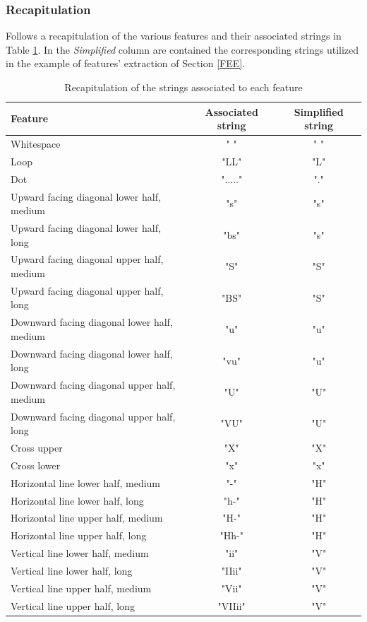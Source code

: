 \subsubsection*{Recapitulation}
Follows a recapitulation of the various features and their associated strings in Table \ref{features}.
In the \textit{Simplified} column are contained the corresponding strings utilized in the example of features' extraction of Section \ref{FEE}.
\begin{table}[H]
\centering
\footnotesize
\begin{tabular}{|l | c | c |} 
 \hline  \multicolumn{1}{|p{2cm}|}{\bfseries Feature}
 & \multicolumn{1}{p{2cm}|}{\centering\bfseries Associated string}  & \multicolumn{1}{p{2cm}|}{\centering\bfseries Simplified string} \\ [0.5ex] 
 \hline\hline
 Whitespace & " " & " "\\ \hline
 Loop & "LL" & "L"\\\hline
 Dot & "....." & "."\\ \hline
 Upward facing diagonal lower half, medium & "s" & "s" \\ \hline
 Upward facing diagonal lower half, long & "bs" & "s" \\\hline
 Upward facing diagonal upper half, medium & "S"& "S" \\ \hline
 Upward facing diagonal upper half, long & "BS" & "S"\\\hline
 Downward facing diagonal lower half, medium& "u"& "u"\\ \hline
 Downward facing diagonal lower half, long &"vu" & "u"\\ \hline
 Downward facing diagonal upper half, medium& "U" & "U"\\\hline
 Downward facing diagonal upper half, long &"VU" & "U"\\\hline
 Cross upper & "X"& "X"\\\hline
 Cross lower & "x"& "x"\\\hline
 Horizontal line lower half, medium & "-"& "H"\\\hline
  Horizontal line lower half, long & "h-"& "H"\\\hline
   Horizontal line upper half, medium & "H-"& "H"\\\hline
    Horizontal line upper half, long & "Hh-"& "H"\\\hline
 Vertical line lower half, medium & "ii"& "V"\\\hline
  Vertical line lower half, long & "IIii"& "V"\\\hline
   Vertical line upper half, medium & "Vii"& "V"\\\hline
    Vertical line upper half, long & "VIIii"& "V"\\ 
 \hline
\end{tabular}
\caption{Recapitulation of the strings associated to each feature}
\label{features}
\end{table}



